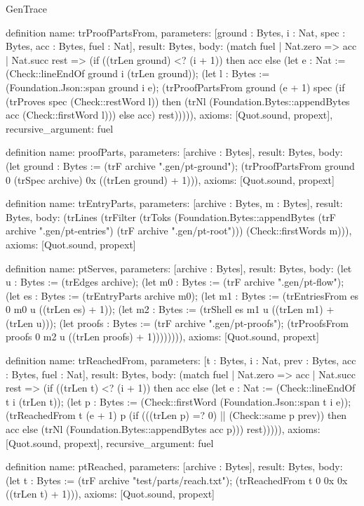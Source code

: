 \begin{lexlean}{GenTrace}
\begin{semanticmodule}
definition{
  name: trProofPartsFrom,
  parameters: [ground : Bytes, i : Nat, spec : Bytes, acc : Bytes, fuel : Nat],
  result: Bytes,
  body: (match fuel
    | Nat.zero => acc
    | Nat.succ rest => (if ((trLen ground) <? (i + 1)) then acc else (let e : Nat := (Check::lineEndOf ground i (trLen ground)); (let l : Bytes := (Foundation.Json::span ground i e); (trProofPartsFrom ground (e + 1) spec (if (trProves spec (Check::restWord l)) then (trNl (Foundation.Bytes::appendBytes acc (Check::firstWord l))) else acc) rest))))),
  axioms: [Quot.sound, propext],
  recursive_argument: fuel
}

definition{
  name: proofParts,
  parameters: [archive : Bytes],
  result: Bytes,
  body: (let ground : Bytes := (trF archive ".gen/pt-ground"); (trProofPartsFrom ground 0 (trSpec archive) 0x ((trLen ground) + 1))),
  axioms: [Quot.sound, propext]
}

definition{
  name: trEntryParts,
  parameters: [archive : Bytes, m : Bytes],
  result: Bytes,
  body: (trLines (trFilter (trToks (Foundation.Bytes::appendBytes (trF archive ".gen/pt-entries") (trF archive ".gen/pt-root"))) (Check::firstWords m))),
  axioms: [Quot.sound, propext]
}

definition{
  name: ptServes,
  parameters: [archive : Bytes],
  result: Bytes,
  body: (let u : Bytes := (trEdges archive); (let m0 : Bytes := (trF archive ".gen/pt-flow"); (let es : Bytes := (trEntryParts archive m0); (let m1 : Bytes := (trEntriesFrom es 0 m0 u ((trLen es) + 1)); (let m2 : Bytes := (trShell es m1 u ((trLen m1) + (trLen u))); (let proofs : Bytes := (trF archive ".gen/pt-proofs"); (trProofsFrom proofs 0 m2 u ((trLen proofs) + 1)))))))),
  axioms: [Quot.sound, propext]
}

definition{
  name: trReachedFrom,
  parameters: [t : Bytes, i : Nat, prev : Bytes, acc : Bytes, fuel : Nat],
  result: Bytes,
  body: (match fuel
    | Nat.zero => acc
    | Nat.succ rest => (if ((trLen t) <? (i + 1)) then acc else (let e : Nat := (Check::lineEndOf t i (trLen t)); (let p : Bytes := (Check::firstWord (Foundation.Json::span t i e)); (trReachedFrom t (e + 1) p (if (((trLen p) =? 0) || (Check::same p prev)) then acc else (trNl (Foundation.Bytes::appendBytes acc p))) rest))))),
  axioms: [Quot.sound, propext],
  recursive_argument: fuel
}

definition{
  name: ptReached,
  parameters: [archive : Bytes],
  result: Bytes,
  body: (let t : Bytes := (trF archive "test/parts/reach.txt"); (trReachedFrom t 0 0x 0x ((trLen t) + 1))),
  axioms: [Quot.sound, propext]
}


\end{semanticmodule}
\end{lexlean}

